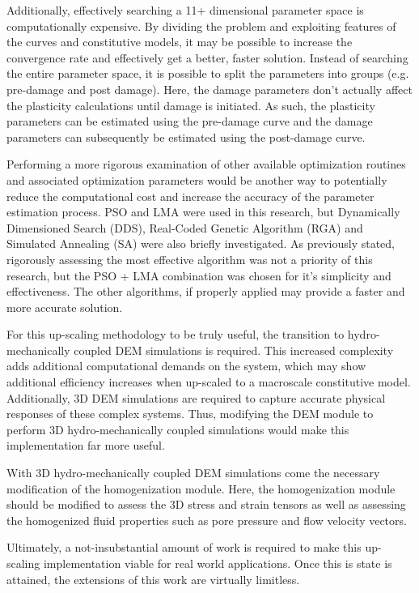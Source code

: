 Additionally, effectively searching a 11+ dimensional parameter space is computationally expensive. By dividing the problem and exploiting features of the curves and constitutive models, it may be possible to increase the convergence rate and effectively get a better, faster solution. Instead of searching the entire parameter space, it is possible to split the parameters into groups (e.g. pre-damage and post damage). Here, the damage parameters don't actually affect the plasticity calculations until damage is initiated. As such, the plasticity parameters can be estimated using the pre-damage curve and the damage parameters can subsequently be estimated using the post-damage curve.

Performing a more rigorous examination of other available optimization routines and associated optimization parameters would be another way to potentially reduce the computational cost and increase the accuracy of the parameter estimation process. PSO and LMA were used in this research, but Dynamically Dimensioned Search (DDS), 
Real-Coded Genetic Algorithm (RGA) and Simulated Annealing (SA) were also briefly investigated. As previously stated, rigorously assessing the most effective algorithm was not a priority of this research, but the PSO + LMA combination was chosen for it's simplicity and effectiveness. The other algorithms, if properly applied may provide a faster and more accurate solution.
	
For this up-scaling methodology to be truly useful, the transition to hydro-mechanically coupled DEM simulations is required. This increased complexity adds additional computational demands on the system, which may show additional efficiency increases when up-scaled to a macroscale constitutive model. Additionally, 3D DEM simulations are required to capture accurate physical responses of these complex systems. Thus, modifying the DEM module to perform 3D hydro-mechanically coupled simulations would make this implementation far more useful.  

With 3D hydro-mechanically coupled DEM simulations come the necessary modification of the homogenization module. Here, the homogenization module should be modified to assess the 3D stress and strain tensors as well as assessing the homogenized fluid properties such as pore pressure and flow velocity vectors. 

Ultimately, a not-insubstantial amount of work is required to make this up-scaling implementation viable for real world applications. Once this is state is attained, the extensions of this work are virtually limitless.